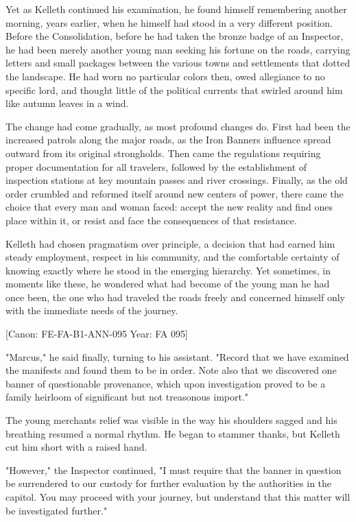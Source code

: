 Yet as Kelleth continued his examination, he found himself remembering
another morning, years earlier, when he himself had stood in a very
different position. Before the Consolidation, before he had taken the
bronze badge of an Inspector, he had been merely another young man
seeking his fortune on the roads, carrying letters and small packages
between the various towns and settlements that dotted the landscape. He
had worn no particular colors then, owed allegiance to no specific lord,
and thought little of the political currents that swirled around him
like autumn leaves in a wind.

The change had come gradually, as most profound changes do. First had
been the increased patrols along the major roads, as the Iron
Banner\textquotesingle s influence spread outward from its original
strongholds. Then came the regulations requiring proper documentation
for all travelers, followed by the establishment of inspection stations
at key mountain passes and river crossings. Finally, as the old order
crumbled and reformed itself around new centers of power, there came the
choice that every man and woman faced: accept the new reality and find
one\textquotesingle s place within it, or resist and face the
consequences of that resistance.

Kelleth had chosen pragmatism over principle, a decision that had earned
him steady employment, respect in his community, and the comfortable
certainty of knowing exactly where he stood in the emerging hierarchy.
Yet sometimes, in moments like these, he wondered what had become of the
young man he had once been, the one who had traveled the roads freely
and concerned himself only with the immediate needs of the journey.

{[}Canon: FE-FA-B1-ANN-095 \textbar{} Year: FA 095{]}

"Marcus," he said finally, turning to his assistant. "Record that we
have examined the manifests and found them to be in order. Note also
that we discovered one banner of questionable provenance, which upon
investigation proved to be a family heirloom of significant but not
treasonous import."

The young merchant\textquotesingle s relief was visible in the way his
shoulders sagged and his breathing resumed a normal rhythm. He began to
stammer thanks, but Kelleth cut him short with a raised hand.

"However," the Inspector continued, "I must require that the banner in
question be surrendered to our custody for further evaluation by the
authorities in the capitol. You may proceed with your journey, but
understand that this matter will be investigated further."

